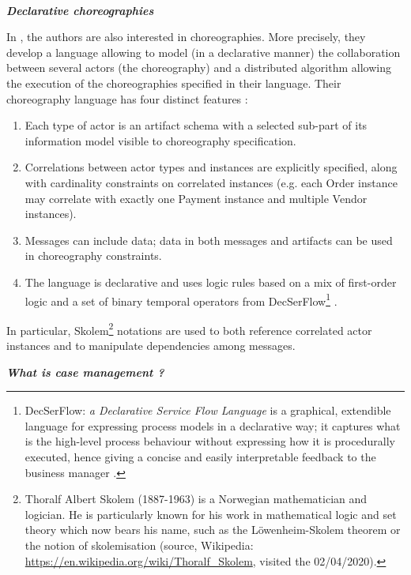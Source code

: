 ~

\noindent\textbf{\textit{Declarative choreographies \cite{sun2012declarative}}}

In \cite{sun2012declarative}, the authors are also interested in choreographies. More precisely, they develop a language allowing to model (in a declarative manner) the collaboration between several actors (the choreography) and a distributed algorithm allowing the execution of the choreographies specified in their language. Their choreography language has four distinct features :
\begin{enumerate}
	\item Each type of actor is an artifact schema with a selected sub-part of its information model visible to choreography specification.
	\item Correlations between actor types and instances are explicitly specified, along with cardinality constraints on correlated instances (e.g. each Order instance may correlate with exactly one Payment instance and multiple Vendor instances).
	\item Messages can include data; data in both messages and artifacts can be used in choreography constraints.
	\item The language is declarative and uses logic rules based on a mix of first-order logic and a set of binary temporal operators from DecSerFlow\footnote{DecSerFlow: \textit{a Declarative Service Flow Language} is a graphical, extendible language for expressing process models in a declarative way; it captures what is the high-level process behaviour without expressing how it is procedurally executed, hence giving a concise and easily interpretable feedback to the business manager \cite{lamma2007learning}.} \cite{van2006decserflow}.
\end{enumerate}
In particular, Skolem\footnote{Thoralf Albert Skolem (1887-1963) is a Norwegian mathematician and logician. He is particularly known for his work in mathematical logic and set theory which now bears his name, such as the L\"{o}wenheim-Skolem theorem or the notion of skolemisation (source, Wikipedia: \url{https://en.wikipedia.org/wiki/Thoralf_Skolem}, visited the 02/04/2020).} notations are used to both reference correlated actor instances and to manipulate dependencies among messages. 





\label{chap1:sec:gag}
\noindent\textbf{\textit{What is case management ?}}

